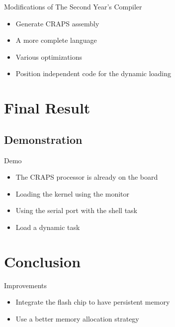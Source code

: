 \documentclass{beamer}
\begin{document}
      \begin{frame}{Modifications of The Second Year's Compiler}
        \begin{itemize}
          \item Generate CRAPS assembly
          \item A more complete language
          \item Various optimizations
          \item Position independent code for the dynamic loading
        \end{itemize}
      \end{frame}

  \section{Final Result}
    \subsection{Demonstration}
      \begin{frame}{Demo}
        \begin{itemize}
          \item The CRAPS processor is already on the board
          \pause
          \item Loading the kernel using the monitor
        \end{itemize}
        \begin{figure}
          \centering
        \end{figure}
        \pause
        \begin{itemize}
          \item Using the serial port with the shell task
          \pause
          \item Load a dynamic task
        \end{itemize}
      \end{frame}

  \section{Conclusion}
    \begin{frame}{Improvements}
      \begin{itemize}
        \item Integrate the flash chip to have persistent memory
        \item Use a better memory allocation strategy
      \end{itemize}
    \end{frame}
\end{document}
